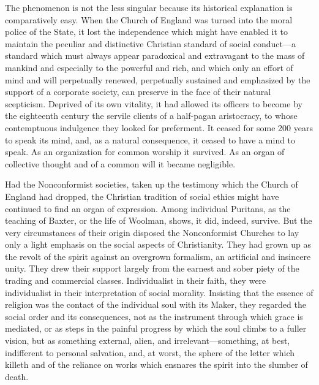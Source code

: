 \documentclass{book}
\begin{document}
The phenomenon is not the less singular because its historical explanation is comparatively easy. When the Church of England was turned into the moral police of the State, it lost the independence which might have enabled it to maintain the peculiar and distinctive Christian standard of social conduct—a standard which must always appear paradoxical and extravagant to the mass of mankind and especially to the powerful and rich, and which only an effort of mind and will perpetually renewed, perpetually sustained and emphasized by the support of a corporate society, can preserve in the face of their natural scepticism. Deprived of its own vitality, it had allowed its officers to become by the eighteenth century the servile clients of a half-pagan aristocracy, to whose contemptuous indulgence they looked for preferment. It ceased for some 200 years to speak its mind, and, as a natural consequence, it ceased to have a mind to speak. As an organization for common worship it survived. As an organ of collective thought and of a common will it became negligible.

Had the Nonconformist societies, taken up the testimony which the Church of England had dropped, the Christian tradition of social ethics might have continued to find an organ of expression. Among individual Puritans, as the teaching of Baxter, or the life of Woolman, shows, it did, indeed, survive. But the very circumstances of their origin disposed the Nonconformist Churches to lay only a light emphasis on the social aspects of Christianity. They had grown up as the revolt of the spirit against an overgrown formalism, an artificial and insincere unity. They drew their support largely from the earnest and sober piety of the trading and commercial classes. Individualist in their faith, they were individualist in their interpretation of social morality. Insisting that the essence of religion was the contact of the individual soul with its Maker, they regarded the social order and its consequences, not as the instrument through which grace is mediated, or as steps in the painful progress by which the soul climbs to a fuller vision, but as something external, alien, and irrelevant—something, at best, indifferent to personal salvation, and, at worst, the sphere of the letter which killeth and of the reliance on works which ensnares the spirit into the slumber of death.
\end{document}

